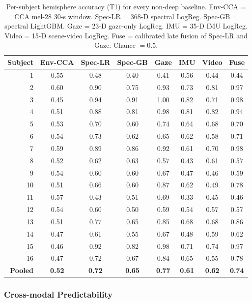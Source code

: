 \documentclass{article}
\begin{document}
\begin{table}[ht]
\centering
\tiny
\caption{Per-subject hemisphere accuracy (T1) for every non-deep baseline.
Env-CCA = CCA mel-28 30-s window. Spec-LR = 368-D spectral LogReg.
Spec-GB = spectral LightGBM. Gaze = 23-D gaze-only LogReg.
IMU = 35-D IMU LogReg. Video = 15-D scene-video LogReg.
Fuse = calibrated late fusion of Spec-LR and Gaze. Chance $= 0.5$.}
\label{tab:persub}
\begin{tabular}{rccccccc}
\toprule
Subject & Env-CCA & Spec-LR & Spec-GB & Gaze & IMU & Video & Fuse \\
\midrule
1  & 0.55 & 0.48 & 0.40 & 0.41 & 0.56 & 0.44 & 0.44 \\
2  & 0.60 & 0.90 & 0.75 & 0.93 & 0.73 & 0.81 & 0.97 \\
3  & 0.45 & 0.94 & 0.91 & 1.00 & 0.82 & 0.71 & 0.98 \\
4  & 0.51 & 0.88 & 0.81 & 0.98 & 0.81 & 0.82 & 0.94 \\
5  & 0.53 & 0.70 & 0.60 & 0.74 & 0.64 & 0.68 & 0.70 \\
6  & 0.54 & 0.73 & 0.62 & 0.65 & 0.62 & 0.58 & 0.71 \\
7  & 0.59 & 0.89 & 0.86 & 0.92 & 0.61 & 0.70 & 0.98 \\
8  & 0.52 & 0.62 & 0.63 & 0.57 & 0.43 & 0.61 & 0.57 \\
9  & 0.54 & 0.60 & 0.60 & 0.67 & 0.47 & 0.46 & 0.59 \\
10 & 0.51 & 0.66 & 0.60 & 0.87 & 0.62 & 0.49 & 0.78 \\
11 & 0.57 & 0.43 & 0.51 & 0.69 & 0.33 & 0.45 & 0.46 \\
12 & 0.54 & 0.60 & 0.50 & 0.59 & 0.54 & 0.57 & 0.57 \\
13 & 0.51 & 0.77 & 0.65 & 0.85 & 0.68 & 0.68 & 0.86 \\
14 & 0.47 & 0.61 & 0.55 & 0.67 & 0.48 & 0.59 & 0.62 \\
15 & 0.46 & 0.92 & 0.82 & 0.98 & 0.71 & 0.74 & 0.97 \\
16 & 0.47 & 0.72 & 0.67 & 0.84 & 0.65 & 0.55 & 0.78 \\
\midrule
\textbf{Pooled} & \textbf{0.52} & \textbf{0.72} & \textbf{0.65} &
    \textbf{0.77} & \textbf{0.61} & \textbf{0.62} & \textbf{0.74} \\
\bottomrule
\end{tabular}
\end{table}

\subsubsection{Cross-modal Predictability}
\label{app:xmodal}
\end{document}
